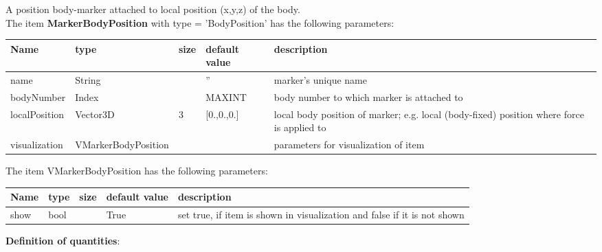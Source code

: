 A position body-marker attached to local position (x,y,z) of the body.
 \\\vspace{12pt} \noindent The item {\bf MarkerBodyPosition} with type = 'BodyPosition' has the following parameters:\vspace{-1cm}\\ 
\begin{center}
  \footnotesize
  \begin{longtable}{| p{4.5cm} | p{2.5cm} | p{0.5cm} | p{2.5cm} | p{6cm} |}
    \hline
    \bf Name & \bf type & \bf size & \bf default value & \bf description \\ \hline
    name &     String &      &     '' &     marker's unique name\\ \hline
    bodyNumber &     Index &      &     MAXINT &     body number to which marker is attached to\\ \hline
    localPosition &     Vector3D &     3 &     [0.,0.,0.] &     local body position of marker; e.g. local (body-fixed) position where force is applied to\\ \hline
    visualization & VMarkerBodyPosition & & & parameters for visualization of item \\ \hline
	  \end{longtable}
	\end{center}
The item VMarkerBodyPosition has the following parameters:\vspace{-1cm}\\ 
\begin{center}
  \footnotesize
  \begin{longtable}{| p{4.5cm} | p{2.5cm} | p{0.5cm} | p{2.5cm} | p{6cm} |}
    \hline
    \bf Name & \bf type & \bf size & \bf default value & \bf description \\ \hline
    show &     bool &      &     True &     set true, if item is shown in visualization and false if it is not shown\\ \hline
	  \end{longtable}
	\end{center}
{\bf Definition of quantities}:\\
\newpage


